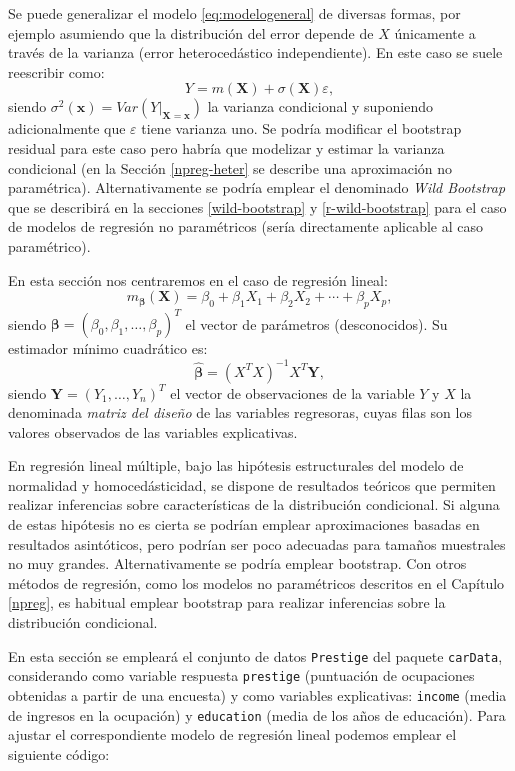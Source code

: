\documentclass[
]{book}
\renewcommand{\boldsymbol}[1]{\symbf{#1}}
\renewcommand{\mathbf}[1]{\symbf{#1}}
\theoremstyle{break}
\theoremstyle{nonumberplain}
\begin{document}
Se puede generalizar el modelo \eqref{eq:modelogeneral} de diversas formas, por ejemplo asumiendo que la distribución del error depende de \(X\) únicamente a través de la varianza (error heterocedástico independiente).
En este caso se suele reescribir como:
\[Y = m(\mathbf{X}) + \sigma(\mathbf{X}) \varepsilon,\]
siendo \(\sigma^2(\mathbf{x}) = Var\left( \left. Y\right\vert_{\mathbf{X}=\mathbf{x}} \right)\) la varianza condicional y suponiendo adicionalmente que \(\varepsilon\) tiene varianza uno.
Se podría modificar el bootstrap residual para este caso pero habría que modelizar y estimar la varianza condicional (en la Sección \ref{npreg-heter} se describe una aproximación no paramétrica).
Alternativamente se podría emplear el denominado \emph{Wild Bootstrap} que se describirá en la secciones \ref{wild-bootstrap} y \ref{r-wild-bootstrap} para el caso de modelos de regresión no paramétricos (sería directamente aplicable al caso paramétrico).

En esta sección nos centraremos en el caso de regresión lineal:
\[m_{\boldsymbol{\beta}}(\mathbf{X}) =  \beta_{0} + \beta_{1}X_{1} + \beta_{2}X_{2} + \cdots + \beta_{p}X_{p},\]
siendo \(\boldsymbol{\beta} = \left(  \beta_{0}, \beta_{1}, \ldots, \beta_{p} \right)^{T}\) el vector de parámetros (desconocidos).
Su estimador mínimo cuadrático es:
\[\boldsymbol{\hat{\beta}} = \left( X^{T}X\right)^{-1}X^{T}\mathbf{Y},\]
siendo \(\mathbf{Y} = \left( Y_{1}, \ldots, Y_{n} \right)^{T}\) el vector de observaciones de la variable \(Y\) y \(X\) la denominada \emph{matriz del diseño} de las variables regresoras, cuyas filas son los valores observados de las variables explicativas.

En regresión lineal múltiple, bajo las hipótesis estructurales del modelo de normalidad y homocedásticidad, se dispone de resultados teóricos que permiten realizar inferencias sobre características de la distribución condicional. Si alguna de estas hipótesis no es cierta se podrían emplear aproximaciones basadas en resultados asintóticos, pero podrían ser poco adecuadas para tamaños muestrales no muy grandes. Alternativamente se podría emplear bootstrap.
Con otros métodos de regresión, como los modelos no paramétricos descritos en el Capítulo \ref{npreg}, es habitual emplear bootstrap para realizar inferencias sobre la distribución condicional.

En esta sección se empleará el conjunto de datos \texttt{Prestige} del paquete \texttt{carData}, considerando como variable respuesta \texttt{prestige} (puntuación de ocupaciones obtenidas a partir de una encuesta) y como variables explicativas: \texttt{income} (media de ingresos en la ocupación) y \texttt{education} (media de los años de educación).
Para ajustar el correspondiente modelo de regresión lineal podemos emplear el siguiente código:
\end{document}
